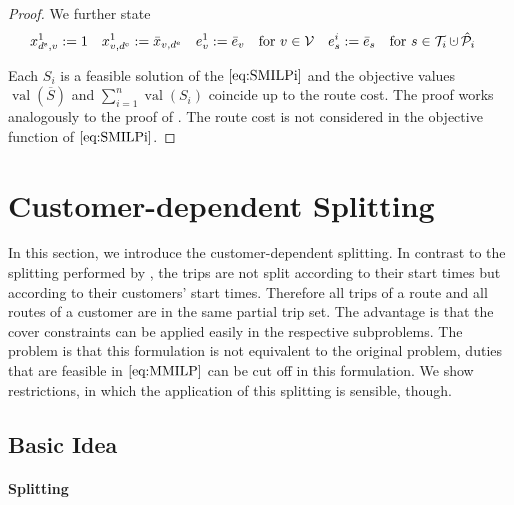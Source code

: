 \begin{proof}
We further state
\begin{align*}
	x^1_{\ds,v} := 1 && x^1_{v,\de} := \bar{x}_{v,\de} && e^1_v := \bar{e}_v && \text{for } v\in\mathcal{V} && e^i_s & := \bar{e}_s && \text{for } s\in\Ti\cupdot\Phat_i
\end{align*}

Each $S_i$ is a feasible solution of the $\eqref{eq:SMILPi}$ and the objective values $\operatorname{val}(\overline{S})$ and ${\sum_{i=1}^n\operatorname{val}\left(S_i\right)}$ coincide up to the route cost. The proof works analogously to the proof of . The route cost is not considered in the objective function of $\eqref{eq:SMILPi}$.

\end{proof}


\section{Customer-dependent Splitting}
\label{sec:customer_dependent_splitting}

In this section, we introduce the customer-dependent splitting. In contrast to the splitting performed by \cite{Knoll}, the trips are not split according to their start times but according to their customers' start times. Therefore all trips of a route and all routes of a customer are in the same partial trip set. The advantage is that the cover constraints can be applied easily in the respective subproblems. The problem is that this formulation is not equivalent to the original problem, \ie duties that are feasible in $\eqref{eq:MMILP}$ can be cut off in this formulation. We show restrictions, in which the application of this splitting is sensible, though. 

\subsection{Basic Idea}

\paragraph{Splitting} \parfill

